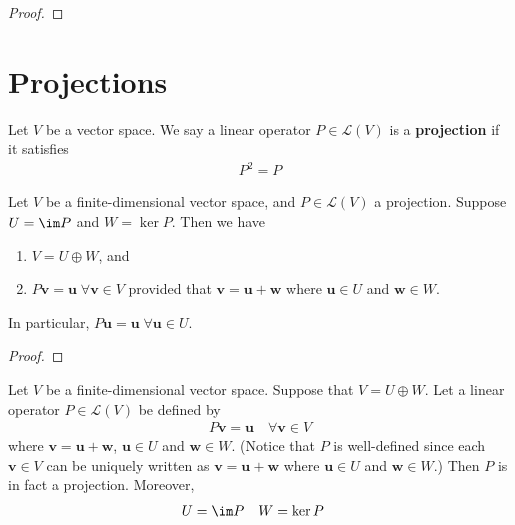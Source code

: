 \documentclass[thmcnt=section, color=blue, 12pt]{my-elegantbook}
\begin{document}
\begin{proof}
\end{proof}



\section{Projections}


\begin{definition} \label{def:1}
    Let $V$ be a vector space. We say a linear operator $P \in \mathcal{L}(V)$ is a \textbf{projection} if it satisfies 
    \begin{align*}
        P^2 = P
    \end{align*}
\end{definition}


\begin{proposition}
    Let $V$ be a finite-dimensional vector space, and $P \in \mathcal{L}(V)$ a projection. Suppose $U = \im P$ and $W = \ker P$. Then we have 
    \begin{enumerate}
        \item $V = U \oplus W$, and 
        \item $P \mathbf{v} = \mathbf{u} \; \forall \mathbf{v} \in V$ provided that $\mathbf{v} = \mathbf{u} + \mathbf{w}$ where $\mathbf{u} \in U$ and $\mathbf{w} \in W$.
    \end{enumerate}
    In particular, $P \mathbf{u} = \mathbf{u} \; \forall \mathbf{u} \in U$.
\end{proposition}

\begin{proof}
\end{proof}


\begin{proposition} \label{pro:4}
    Let $V$ be a finite-dimensional vector space. Suppose that $V = U \oplus W$. Let a linear operator $P \in \mathcal{L}(V)$ be defined by 
    \begin{align*}
        P \mathbf{v} = \mathbf{u}
        \quad \forall \mathbf{v} \in V
    \end{align*}
    where $\mathbf{v} = \mathbf{u} + \mathbf{w}$, $\mathbf{u} \in U$ and $\mathbf{w} \in W$. (Notice that $P$ is well-defined since each $\mathbf{v} \in V$ can be uniquely written as $\mathbf{v} = \mathbf{u} + \mathbf{w}$ where $\mathbf{u} \in U$ and $\mathbf{w} \in W$.) Then $P$ is in fact a projection. Moreover, 
    \begin{align*}
        U &= \im P & W &= \ker P
    \end{align*}
\end{proposition}
\end{document}
